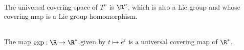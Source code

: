 \documentclass[a4paper]{article}
\begin{document}
\begin{eg}{}{}\\
The universal covering space of $T^n$ is $\R^n$, which is also a Lie group and whose covering map is a Lie group homomorphism. 
\end{eg}

\begin{eg}{}{}\\
The map $\text{exp}:\R\to\R^\ast$ given by $t\mapsto e^t$ is a universal covering map of $\R^\ast$. 
\end{eg}
\end{document}
